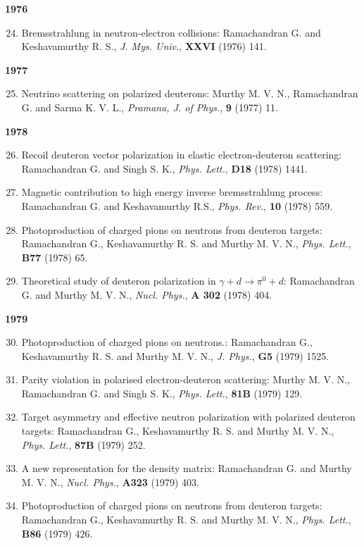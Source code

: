 \textbf{1976}
\begin{enumerate}
\setcounter{enumi}{23}
\item Bremsstrahlung in neutron-electron collisions: Ramachandran G. and Keshavamurthy R. S., \textit{J. Mys. Univ.}, {\bf XXVI} (1976) 141.
\end{enumerate}
\textbf{1977}
\begin{enumerate}
\setcounter{enumi}{24}
\item Neutrino scattering on polarized deuterons: Murthy M. V. N., Ramachandran G. and Sarma K. V. L., \textit{Pramana, J. of Phys.}, {\bf 9} (1977) 11.
\end{enumerate}
\textbf{1978}
\begin{enumerate}
\setcounter{enumi}{25}
\item Recoil deuteron vector polarization in elastic electron-deuteron scattering: Ramachandran G. and Singh S. K., \textit{Phys. Lett.}, {\bf D18} (1978) 1441.
\item Magnetic contribution to high energy inverse bremsstrahlung process: Ramachandran G. and Keshavamurthy R.S., \textit{Phys. Rev.}, {\bf 10} (1978) 559.
\item Photoproduction of charged pions on neutrons from deuteron targets: Ramachandran G., Keshavamurthy R. S. and Murthy M. V. N., \textit{Phys. Lett.}, {\bf B77} (1978) 65.
\item Theoretical study of deuteron polarization in $\gamma+d\to \pi^{0}+d$: Ramachandran G. and Murthy M. V. N., \textit{Nucl. Phys.}, {\bf A 302} (1978) 404.
\end{enumerate}
\textbf{1979}
\begin{enumerate}
\setcounter{enumi}{29}
\item Photoproduction of charged pions on neutrons.: Ramachandran G., Keshavamurthy R. S. and Murthy M. V. N., \textit{J. Phys.}, {\bf G5} (1979) 1525.
\item Parity violation in polarised electron-deuteron scattering: Murthy M. V. N., Ramachandran G. and Singh S. K., \textit{Phys. Lett.}, {\bf 81B} (1979) 129.
\item Target asymmetry and effective neutron polarization with polarized deuteron targets: Ramachandran G., Keshavamurthy R. S. and Murthy M. V. N., \textit{Phys. Lett.}, {\bf 87B} (1979) 252.
\item A new representation for the density matrix: Ramachandran G. and Murthy M. V. N., \textit{Nucl. Phys.}, {\bf A323} (1979) 403.
\item Photoproduction of charged pions on neutrons from deuteron targets: Ramachandran G., Keshavamurthy R. S. and Murthy M. V. N., \textit{Phys. Lett.}, {\bf B86} (1979) 426.
\end{enumerate}
